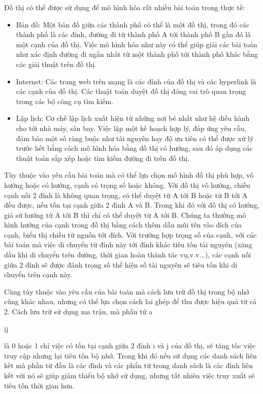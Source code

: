 Đồ thị có thể được sử dụng để mô hình hóa rất nhiều bài toán trong thực tế: \cite{sedgewick2011algorithms}
\begin{itemize}
\item Bản đồ: Một bản đồ giữa các thành phố có thể là một đồ thị, trong đó các thành phố là các đỉnh, đường đi từ thành phố A tới thành phố B gần đó là một cạnh của đồ thị. Việc mô hình hóa như này có thể giúp giải các bài toán như xác định đường đi ngắn nhất từ một thành phố tới thành phố khác bằng các giải thuật trên đồ thị.
\item Internet: Các trang web trên mạng là các đỉnh của đồ thị và các hyperlink là các cạnh của đồ thị. Các thuật toán duyệt đồ thị đóng vai trò quan trọng trong các bộ công cụ tìm kiếm.
\item Lập lịch: Cơ chế lập lịch xuất hiện từ những nơi bé nhất như hệ điều hành cho tới nhà máy, sân bay. Việc lập một kế hoạch hợp lý, đáp ứng yêu cầu, đảm bảo một số ràng buộc như tài nguyên hay độ ưu tiên có thể được xử lý trước hết bằng cách mô hình hóa bằng đồ thị có hướng, sau đó áp dụng các thuật toán sắp xếp hoặc tìm kiếm đường đi trên đồ thị.
\end{itemize}
Tùy thuộc vào yêu cầu bài toán mà có thể lựa chọn mô hình đồ thị phù hợp, vô hướng hoặc có hướng, cạnh có trọng số hoặc không. Với đồ thị vô hướng, chiều cạnh nối 2 đỉnh là không quan trọng, có thể duyệt từ A tới B hoặc từ B tới A đều được, nếu tồn tại cạnh giữa 2 đỉnh A và B. Trong khi đó với đồ thị có hướng, giả sử hướng từ A tới B thì chỉ có thể duyệt từ A tới B. Chúng ta thường mô hình hướng của cạnh trong đồ thị bằng cách thêm dẫu mũi tên vào đích của cạnh, biểu thị chiều từ nguồn tới đích. Với trường hợp trọng số của cạnh, với các bài toán mà việc di chuyển từ đỉnh này tới đỉnh khác tiêu tốn tài nguyên (xăng dầu khi di chuyển trên đường, thời gian hoàn thành tác vụ,v.v...), các cạnh nối giữa 2 đỉnh sẽ được đánh trọng số thể hiện số tài nguyên sẽ tiêu tốn khi di chuyển trên cạnh này.
 

Cùng tùy thuộc vào yêu cầu của bài toán mà cách lưu trữ đồ thị trong bộ nhớ cũng khác nhau, nhưng có thể lựa chọn cách lai ghép để thu được hiệu quả từ cả 2. Cách lưu trữ sử dụng ma trận, mà phần tử a\begin{tiny}ij\end{tiny} là 0 hoặc 1 chỉ việc có tồn tại cạnh giữa 2 đỉnh i và j của đồ thị, sẽ tăng tốc việc truy cập nhưng lại tiêu tốn bộ nhớ. Trong khi đó nếu sử dụng các danh sách liên kết mà phần từ đầu là các đỉnh và các phẩn từ trong danh sách là các đỉnh liên kết với nó sẽ giúp giảm thiểu bộ nhớ sử dụng, nhưng tất nhiên việc truy xuất sẽ tiêu tốn thời gian hơn.

